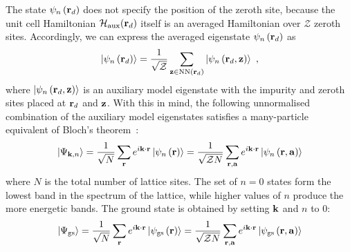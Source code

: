 \documentclass[reprint,hidelinks]{revtex4-2}
\begin{document}
The state \(\psi_n\left({\bf r}_d\right)\) does not specify the position of the zeroth site, because the unit cell Hamiltonian \(\mathcal{H}_\text{aux}({\bf r}_d)\) itself is an averaged Hamiltonian over \(\mathcal{Z}\) zeroth sites. Accordingly, we can express the averaged eigenstate \(\psi_n\left({\bf r}_d\right)\) as
\begin{equation}\begin{aligned}
	\ket{\psi_n\left({\bf r}_d\right)} = \frac{1}{\sqrt\mathcal{Z}}\sum_{{\bf z} \in \text{NN}({\bf r}_d)}\ket{\psi_n\left({\bf r}_d, {\bf z}\right)}~,
\end{aligned}\end{equation}
where \(\ket{\psi_n\left({\bf r}_d, {\bf z}\right)}\) is an auxiliary model eigenstate with the impurity and zeroth sites placed at \({\bf r}_d\) and \({\bf z}\). With this in mind, the following unnormalised combination of the auxiliary model eigenstates satisfies a many-particle equivalent of Bloch's theorem~\cite{stoyanova}:
\begin{equation}\begin{aligned}
	\ket{\Psi_{{\bf k}, n}} = \frac{1}{\sqrt N}\sum_{{\bf r}} e^{i {\bf k}\cdot{\bf r}} \ket{\psi_{n}\left({\bf r}\right)} = \frac{1}{\sqrt{\mathcal{Z} N}}\sum_{{\bf r}, {\bf a}} e^{i {\bf k}\cdot{\bf r}} \ket{\psi_{n}\left({\bf r}, {\bf a}\right)}
\end{aligned}\end{equation}
where \(N\) is the total number of lattice sites. The set of \(n=0\) states form the lowest band in the spectrum of the lattice, while higher values of \(n\) produce the more energetic bands. The ground state is obtained by setting \({\bf k}\) and \(n\) to 0:
\begin{equation}\begin{aligned}
	\ket{\Psi_\text{gs}} = \frac{1}{\sqrt N}\sum_{{\bf r}} e^{i {\bf k}\cdot{\bf r}} \ket{\psi_\text{gs}\left({\bf r}\right)} = \frac{1}{\sqrt{\mathcal{Z} N}}\sum_{{\bf r}, {\bf a}} e^{i {\bf k}\cdot{\bf r}} \ket{\psi_\text{gs}\left({\bf r}, {\bf a}\right)}
\end{aligned}\end{equation}
\end{document}
